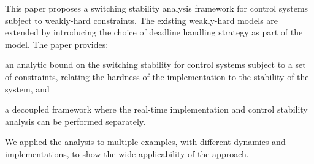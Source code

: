 This paper proposes a switching stability analysis framework for control systems subject to weakly-hard constraints.
The existing weakly-hard models are extended by introducing the choice of deadline handling strategy as part of the model.
The paper provides:
\begin{enumerate*}[label=(\roman*)]
    \item an analytic bound on the switching stability for control systems subject to a set of constraints, relating the hardness of the implementation to the stability of the system, and
    \item a decoupled framework where the real-time implementation and control stability analysis can be performed separately.
\end{enumerate*}
We applied the analysis to multiple examples, with different dynamics and implementations, to show the wide applicability of the approach.
